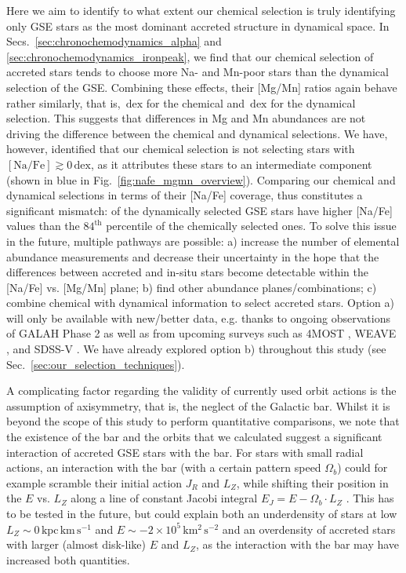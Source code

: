 \documentclass[fleqn,usenatbib]{mnras}
\newcommand{\dex}{\,\mathrm{dex}}	%
\newcommand{\kpckms}{\,\mathrm{kpc\,km\,s^{-1}}}	%
\newcommand{\kmkmss}{\,\mathrm{km^2\,s^{-2}}}	%
\begin{document}
Here we aim to identify to what extent our chemical selection is truly identifying only GSE stars as the most dominant accreted structure in dynamical space. In Secs.~\ref{sec:chronochemodynamics_alpha} and \ref{sec:chronochemodynamics_ironpeak}, we find that our chemical selection of accreted stars tends to choose more Na- and Mn-poor stars than the dynamical selection of the GSE. Combining these effects, their [Mg/Mn] ratios again behave rather similarly, that is, $\dex$ for the chemical and $\dex$ for the dynamical selection. This suggests that differences in Mg and Mn abundances are not driving the difference between the chemical and dynamical selections. We have, however, identified that our chemical selection is not selecting stars with $\mathrm{[Na/Fe]} \gtrsim 0\dex$, as it attributes these stars to an intermediate component (shown in blue in Fig.~\ref{fig:nafe_mgmn_overview}). Comparing our chemical and dynamical selections in terms of their [Na/Fe] coverage, thus constitutes a significant mismatch:  of the dynamically selected GSE stars have higher [Na/Fe] values than the $84^\text{th}$ percentile of the chemically selected ones. To solve this issue in the future, multiple pathways are possible: a) increase the number of elemental abundance measurements and decrease their uncertainty in the hope that the differences between accreted and in-situ stars become detectable within the [Na/Fe] vs. [Mg/Mn] plane; b) find other abundance planes/combinations; c) combine chemical with dynamical information to select accreted stars. Option a) will only be available with new/better data, e.g. thanks to ongoing observations of GALAH Phase 2 as well as from upcoming surveys such as 4MOST \citep{deJong2019}, WEAVE \citep{WEAVE2018}, and SDSS-V \citep{Kollmeier2017}. We have already explored option b) throughout this study (see Sec.~\ref{sec:our_selection_techniques}).

A complicating factor regarding the validity of currently used orbit actions is the assumption of axisymmetry, that is, the neglect of the Galactic bar. Whilst it is beyond the scope of this study to perform quantitative comparisons, we note that the existence of the bar and the orbits that we calculated suggest a significant interaction of accreted GSE stars with the bar. For stars with small radial actions, an interaction with the bar (with a certain pattern speed $\Omega_b$) could for example scramble their initial action $J_R$ and $L_Z$, while shifting their position in the $E$ vs. $L_Z$ along a line of constant Jacobi integral $E_J = E - \Omega_b \cdot L_Z$ \citep{Binney2008, Sellwood2014}. This has to be tested in the future, but could explain both an underdensity of stars at low $L_Z \sim 0 \kpckms$ and $E \sim -2\times10^5 \kmkmss $ and an overdensity of accreted stars with larger (almost disk-like) $E$ and $L_Z$, as the interaction with the bar may have increased both quantities.
\end{document}
